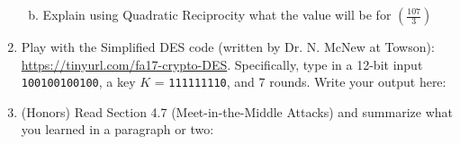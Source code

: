 \documentclass[12pt]{amsart}
\theoremstyle{plain}
\theoremstyle{definition}
\begin{document}
\begin{enumerate}[1.]
\begin{enumerate}[a.]
\begin{framed}
		\vspace{.3in}
		\end{framed}
		\item Explain using Quadratic Reciprocity what the value will be for $\left(\frac{107}{3}\right)$
		\begin{framed}
		\vspace{.5in}
		\end{framed}
		\end{enumerate}
\item Play with the Simplified DES code (written by Dr. N. McNew at Towson): \url{https://tinyurl.com/fa17-crypto-DES}. Specifically, type in a 12-bit input \texttt{100100100100}, a key $K$ = \texttt{111111110}, and 7 rounds.  Write your output here:
		\begin{framed}
		\vspace{.5in}
		\end{framed}
\item (Honors) Read Section 4.7 (Meet-in-the-Middle Attacks) and summarize what you learned in a paragraph or two:
	\begin{framed}
    \vspace{3in}
    \end{framed}



\end{enumerate}
	
\end{document}
